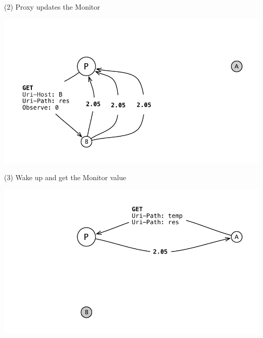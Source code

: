 \documentclass{beamer}
\begin{document}
\begin{frame}{(2) Proxy updates the Monitor}
 \begin{center}
  \includegraphics[width=\textwidth]{../../share/images/monitor2.pdf}
 \end{center}
\end{frame}

\begin{frame}{(3) Wake up and get the Monitor value}
 \begin{center}
  \includegraphics[width=\textwidth]{../../share/images/monitor3.pdf}
 \end{center}
\end{frame}
\end{document}
